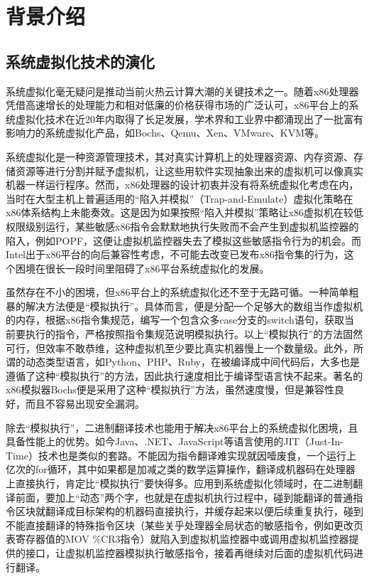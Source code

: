 
\chapter{背景介绍}
\label{chap:background}

\section{系统虚拟化技术的演化}

系统虚拟化毫无疑问是推动当前火热云计算大潮的关键技术之一。随着x86处理器凭借高速增长的处理能力和相对低廉的价格获得市场的广泛认可，x86平台上的系统虚拟化技术在近20年内取得了长足发展，学术界和工业界中都涌现出了一批富有影响力的系统虚拟化产品，如Bochs、Qemu、Xen、VMware、KVM等。

系统虚拟化是一种资源管理技术，其对真实计算机上的处理器资源、内存资源、存储资源等进行分割并赋予虚拟机，让这些用软件实现抽象出来的虚拟机可以像真实机器一样运行程序。然而，x86处理器的设计初衷并没有将系统虚拟化考虑在内，当时在大型主机上普遍适用的``陷入并模拟''（Trap-and-Emulate）虚拟化策略在x86体系结构上未能奏效。这是因为如果按照``陷入并模拟''策略让x86虚拟机在较低权限级别运行，某些敏感x86指令会默默地执行失败而不会产生到虚拟机监控器的陷入，例如POPF，这便让虚拟机监控器失去了模拟这些敏感指令行为的机会。而Intel出于x86平台的向后兼容性考虑，不可能去改变已发布x86指令集的行为，这个困境在很长一段时间里阻碍了x86平台系统虚拟化的发展。

虽然存在不小的困境，但x86平台上的系统虚拟化还不至于无路可循。一种简单粗暴的解决方法便是``模拟执行''。具体而言，便是分配一个足够大的数组当作虚拟机的内存，根据x86指令集规范，编写一个包含众多case分支的switch语句，获取当前要执行的指令，严格按照指令集规范说明模拟执行。以上``模拟执行''的方法固然可行，但效率不敢恭维，这种虚拟机至少要比真实机器慢上一个数量级。此外，所谓的动态类型语言，如Python、PHP、Ruby，在被编译成中间代码后，大多也是遵循了这种``模拟执行''的方法，因此执行速度相比于编译型语言快不起来。著名的x86模拟器Bochs便是采用了这种``模拟执行''方法，虽然速度慢，但是兼容性良好，而且不容易出现安全漏洞。

除去``模拟执行''，二进制翻译技术也能用于解决x86平台上的系统虚拟化困境，且具备性能上的优势。如今Java、.NET、JavaScript等语言使用的JIT（Just-In-Time）技术也是类似的套路。不能因为指令翻译难实现就因噎废食，一个运行上亿次的for循环，其中如果都是加减之类的数学运算操作，翻译成机器码在处理器上直接执行，肯定比``模拟执行''要快得多。应用到系统虚拟化领域时，在二进制翻译前面，要加上``动态''两个字，也就是在虚拟机执行过程中，碰到能翻译的普通指令区块就翻译成目标架构的机器码直接执行，并缓存起来以便后续重复执行，碰到不能直接翻译的特殊指令区块（某些关乎处理器全局状态的敏感指令，例如更改页表寄存器值的MOV \%CR3指令）就陷入到虚拟机监控器中或调用虚拟机监控器提供的接口，让虚拟机监控器模拟执行敏感指令，接着再继续对后面的虚拟机代码进行翻译。

